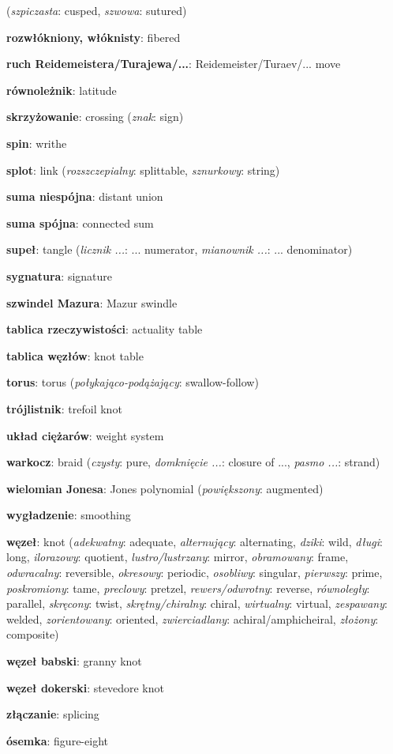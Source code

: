 (\emph{szpiczasta}: cusped, \emph{szwowa}: sutured)
\item \textbf{rozwłókniony, włóknisty}: fibered
\item \textbf{ruch Reidemeistera/Turajewa/...}: Reidemeister/Turaev/... move
\item \textbf{równoleżnik}: latitude
\item \textbf{skrzyżowanie}: crossing
(\emph{znak}: sign)
\item \textbf{spin}: writhe
\item \textbf{splot}: link
(\emph{rozszczepialny}: splittable, \emph{sznurkowy}: string)
\item \textbf{suma niespójna}: distant union
\item \textbf{suma spójna}: connected sum
\item \textbf{supeł}: tangle
(\emph{licznik ...}: ... numerator, \emph{mianownik ...}: ... denominator)
\item \textbf{sygnatura}: signature
\item \textbf{szwindel Mazura}: Mazur swindle
\item \textbf{tablica rzeczywistości}: actuality table
\item \textbf{tablica węzłów}: knot table
\item \textbf{torus}: torus
(\emph{połykająco-podążający}: swallow-follow)
\item \textbf{trójlistnik}: trefoil knot
\item \textbf{układ ciężarów}: weight system
\item \textbf{warkocz}: braid
(\emph{czysty}: pure, \emph{domknięcie ...}: closure of ..., \emph{pasmo ...}: strand)
\item \textbf{wielomian Jonesa}: Jones polynomial
(\emph{powiększony}: augmented)
\item \textbf{wygładzenie}: smoothing
\item \textbf{węzeł}: knot
(\emph{adekwatny}: adequate, \emph{alternujący}: alternating, \emph{dziki}: wild, \emph{długi}: long, \emph{ilorazowy}: quotient, \emph{lustro/lustrzany}: mirror, \emph{obramowany}: frame, \emph{odwracalny}: reversible, \emph{okresowy}: periodic, \emph{osobliwy}: singular, \emph{pierwszy}: prime, \emph{poskromiony}: tame, \emph{preclowy}: pretzel, \emph{rewers/odwrotny}: reverse, \emph{równoległy}: parallel, \emph{skręcony}: twist, \emph{skrętny/chiralny}: chiral, \emph{wirtualny}: virtual, \emph{zespawany}: welded, \emph{zorientowany}: oriented, \emph{zwierciadlany}: achiral/amphicheiral, \emph{złożony}: composite)
\item \textbf{węzeł babski}: granny knot
\item \textbf{węzeł dokerski}: stevedore knot
\item \textbf{złączanie}: splicing
\item \textbf{ósemka}: figure-eight
